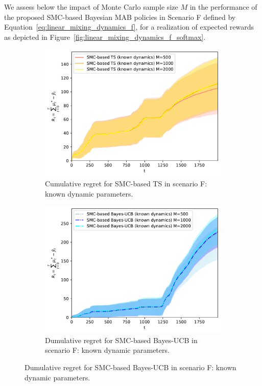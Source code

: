 \clearpage
We assess below the impact of Monte Carlo sample size $M$ in the performance of the proposed SMC-based Bayesian MAB policies
in Scenario F defined by Equation~\eqref{eq:linear_mixing_dynamics_f},
for a realization of expected rewards as depicted in Figure~\ref{fig:linear_mixing_dynamics_f_softmax}.

\begin{figure}[!h]
\centering
\begin{subfigure}[b]{0.45\textwidth}
\includegraphics[width=\textwidth]{./fods_figs/dynamic/softmax/f_selectedM_cumulative_regret_dknown_ts}
\caption{Cumulative regret for SMC-based TS in scenario F: known dynamic parameters.}
\label{fig:dynamic_bandits_softmax_f_ts_dknown_M}
\end{subfigure}\qquad
\begin{subfigure}[b]{0.45\textwidth}
\includegraphics[width=\textwidth]{./fods_figs/dynamic/softmax/f_selectedM_cumulative_regret_dknown_bucb}
\caption{Dumulative regret for SMC-based Bayes-UCB in scenario F: known dynamic parameters.}
\label{fig:dynamic_bandits_softmax_f_bucb_dknown_M}
\end{subfigure}


\end{figure}
